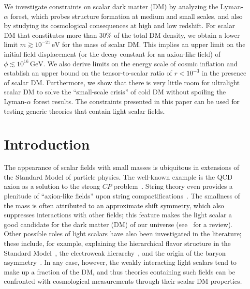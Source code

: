 \documentclass[11pt,nofootinbib]{article}
\numberwithin{equation}{section}
\begin{document}
\begin{titlepage}
\begin{center}
\end{center} 



\vspace{1cm}



\noindent
We investigate constraints on scalar dark matter
 (DM) by analyzing the Lyman-$\alpha$ forest, which probes structure formation
 at medium and small scales, and also by studying its
 cosmological consequences at high and low redshift. For scalar DM that constitutes more than
 30\% of the total DM density, we obtain a lower limit $m \gtrsim
 10^{-21}\, \mathrm{eV}$ for the mass of scalar DM. This implies an upper
 limit on the initial field displacement (or the decay constant for an
 axion-like field) of $\phi \lesssim 10^{16}\, \mathrm{GeV}$. We also
 derive limits on the energy scale of cosmic inflation and establish an
 upper bound on the tensor-to-scalar ratio of $r <  10^{-3}$ in the
 presence of scalar DM. Furthermore, we show that there is very little
 room for ultralight scalar DM to solve the ``small-scale crisis'' of
 cold DM without spoiling the Lyman-$\alpha$ forest results. The constraints
 presented in this paper can be used for testing generic theories that
 contain light scalar fields. 
\vfil

\end{titlepage}

\newpage
\tableofcontents

\section{Introduction}
\label{sec:intro}

The appearance of scalar fields with small masses is ubiquitous in
extensions of the Standard Model of particle physics.
The well-known example is the QCD
axion as a solution to the strong $CP$
problem~\cite{Peccei:1977hh,Weinberg:1977ma,Wilczek:1977pj}.  
String theory even provides a plenitude of ``axion-like fields'' upon 
string compactifications~\cite{Svrcek:2006yi,Douglas:2006es,Arvanitaki:2009fg}.
The smallness of the mass is often attributed to an approximate
shift symmetry, which also suppresses interactions with other fields;
this feature makes the light scalar a good candidate for the dark matter (DM)
of our universe (see~\cite{Ringwald:2012hr} for a review).
Other possible roles of light scalars have also been investigated in the
literature; these include, for example,
explaining the hierarchical flavor structure in the Standard
Model~\cite{Wilczek:1982rv}, 
the electroweak hierarchy~\cite{Graham:2015cka},
and the origin of the baryon asymmetry~\cite{DeSimone:2016bok}.
In any case, however, the weakly interacting light scalars tend to make up
a fraction of the DM, and thus theories containing such fields
can be confronted with cosmological measurements through their scalar DM properties.
\end{document}
